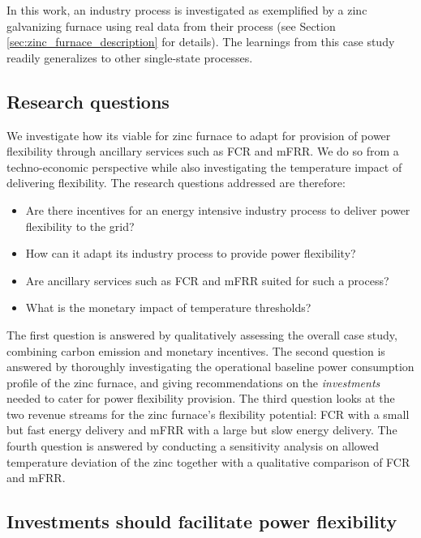 \documentclass[lettersize,journal]{IEEEtran}
\begin{document}
In this work, an industry process is investigated as exemplified by a zinc galvanizing furnace using real data from their process (see Section \ref{sec:zinc_furnace_description} for details). The learnings from this case study readily generalizes to other single-state processes.

\subsection{Research questions}

We investigate how its viable for zinc furnace to adapt for provision of power flexibility through ancillary services such as FCR and mFRR. We do so from a techno-economic perspective while also investigating the temperature impact of delivering flexibility. The research questions addressed are therefore:

\IEEEpubidadjcol

\begin{itemize}
    \item Are there incentives for an energy intensive industry process to deliver power flexibility to the grid?
    \item How can it adapt its industry process to provide power flexibility?
    \item Are ancillary services such as FCR and mFRR suited for such a process?
    \item What is the monetary impact of temperature thresholds?
\end{itemize}

The first question is answered by qualitatively assessing the overall case study, combining carbon emission and monetary incentives. The second question is answered by thoroughly investigating the operational baseline power consumption profile of the zinc furnace, and giving recommendations on the \textit{investments} needed to cater for power flexibility provision. The third question looks at the two revenue streams for the zinc furnace's flexibility potential: FCR with a small but fast energy delivery and mFRR with a large but slow energy delivery. The fourth question is answered by conducting a sensitivity analysis on allowed temperature deviation of the zinc together with a qualitative comparison of FCR and mFRR.


\subsection{Investments should facilitate power flexibility}
\end{document}
